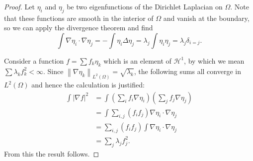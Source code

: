 \documentclass[11pt]{amsart}
\theoremstyle{remark}
\theoremstyle{definition}
\newcommand{\norm}[1]{\left\lVert#1\right\rVert}
\newcommand{\paren}[1]{\left( #1 \right)}
\newcommand{\abs}[1]{\left\lvert #1 \right\rvert}
\newcommand{\del}{\partial}
\newcommand{\grad}{\nabla}
\renewcommand{\div}{\operatorname{div}}
\newcommand{\Laplace}{\Delta}
\newcommand{\eigen}[1]{\eta_{#1}} %
\newcommand{\HD}{\mathcal{H}}
\begin{document}
\begin{proof}
Let $\eigen{i}$ and $\eigen{j}$ be two eigenfunctions of the Dirichlet Laplacian on $\Omega$.  Note that these functions are smooth in the interior of $\Omega$ and vanish at the boundary, so we can apply the divergence theorem and find
\[ \int \grad \eigen{i} \cdot \grad \eigen{j} = - \int \eigen{i} \Laplace \eigen{j} = \lambda_j \int \eigen{i} \eigen{j} = \lambda_j \delta_{i=j}. \]

Consider a function $f = \sum f_k \eigen{k}$ which is an element of $\HD^1$, by which we mean $\sum \lambda_k f_k^2 < \infty$.  Since $\norm{\grad \eigen{k}}_{L^2(\Omega)} = \sqrt{\lambda_k}$, the following sums all converge in $L^2(\Omega)$ and hence the calculation is justified:
\begin{align*}
\int \abs{\grad f}^2 &= \int \paren{\sum_i f_i \grad \eigen{i} } \paren{\sum_j f_j \grad \eigen{j}}
\\ &= \int \sum_{i,j} (f_i f_j) \grad \eigen{i} \cdot \grad \eigen{j}
\\ &= \sum_{i,j} (f_i f_j) \int \grad \eigen{i} \cdot \grad \eigen{j}
\\ &= \sum_j \lambda_j f_j^2.
\end{align*}
From this the result follows.
\end{proof}
\end{document}
